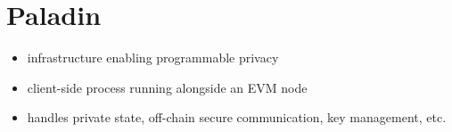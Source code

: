 \section{Paladin}

\begin{itemize}
  \item infrastructure enabling programmable privacy
  \item client-side process running alongside an EVM node
  \item handles private state, off-chain secure communication, key management, etc.
\end{itemize}